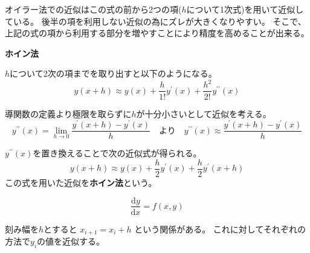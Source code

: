 \documentclass[12pt,b5paper]{ltjsarticle}
\begin{document}
オイラー法での近似はこの式の前から2つの項($h$について1次式)を用いて近似している。
後半の項を利用しない近似の為にズレが大きくなりやすい。
そこで、上記の式の項から利用する部分を増やすことにより精度を高めることが出来る。

\dotfill
\textbf{ホイン法}
\dotfill

$h$について2次の項までを取り出すと以下のようになる。
\begin{equation}
 y(x+h)
  \approx
  y(x) + \frac{h}{1!}y^{\prime}(x) + \frac{h^2}{2!}y^{\prime\prime}(x)
\end{equation}

導関数の定義より極限を取らずに$h$が十分小さいとして近似を考える。
\begin{equation}
 y^{\prime\prime}(x) = \lim_{h\rightarrow 0} \frac{y^{\prime}(x+h)-y^{\prime}(x)}{h}
  \quad \text{より}\quad
  y^{\prime\prime}(x) \approx \frac{y^{\prime}(x+h)-y^{\prime}(x)}{h}
\end{equation}

$y^{\prime\prime}(x)$を置き換えることで次の近似式が得られる。
\begin{equation}
 y(x+h)
  \approx
  y(x) + \frac{h}{2}y^{\prime}(x) + \frac{h}{2}y^{\prime}(x+h)
\end{equation}
この式を用いた近似を\textbf{ホイン法}という。

\dotfill

\begin{equation}
 \frac{\mathrm{d}y}{\mathrm{d}x} = f(x,y)
\end{equation}

刻み幅を$h$とすると
$x_{i+1} = x_{i}+h$
という関係がある。
これに対してそれぞれの方法で$y_{i}$の値を近似する。
\end{document}
